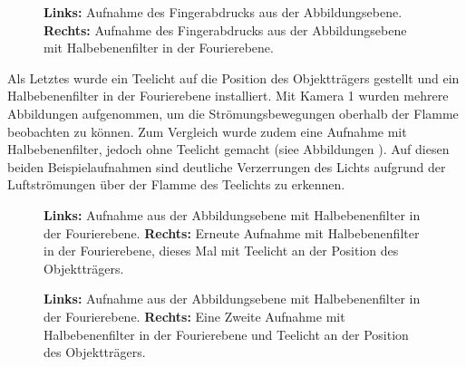 \begin{figure}
	\centering
	\caption{
		\textbf{Links:} Aufnahme des Fingerabdrucks aus der Abbildungsebene. \textbf{Rechts:} Aufnahme des Fingerabdrucks aus der Abbildungsebene mit Halbebenenfilter in der Fourierebene.
	}
	\label{fig:example21_Halbebenenfilter}
\end{figure}

Als Letztes wurde ein Teelicht auf die Position des Objektträgers gestellt und ein Halbebenenfilter in der Fourierebene installiert. Mit Kamera 1 wurden mehrere Abbildungen aufgenommen, um die Strömungsbewegungen oberhalb der Flamme beobachten zu können. Zum Vergleich wurde zudem eine Aufnahme mit Halbebenenfilter, jedoch ohne Teelicht gemacht (siee Abbildungen ). Auf diesen beiden Beispielaufnahmen sind deutliche Verzerrungen des Lichts aufgrund der Luftströmungen über der Flamme des Teelichts zu erkennen. 

\begin{figure}
	\centering
	\caption{
		\textbf{Links:} Aufnahme aus der Abbildungsebene mit Halbebenenfilter in der Fourierebene.
		\textbf{Rechts:} Erneute Aufnahme mit Halbebenenfilter in der Fourierebene, dieses Mal mit Teelicht an der Position des Objektträgers.
	}
	\label{fig:example23_Halbebenenfilter_mit_und_ohne_Teelicht}
\end{figure}

\begin{figure}
	\centering
	\caption{
		\textbf{Links:} Aufnahme aus der Abbildungsebene mit Halbebenenfilter in der Fourierebene.
		\textbf{Rechts:} Eine Zweite Aufnahme mit Halbebenenfilter in der Fourierebene und Teelicht an der Position des Objektträgers.}
	\label{fig:example22_Halbebenenfilter_mit_und_ohne_Teelicht}
\end{figure}


